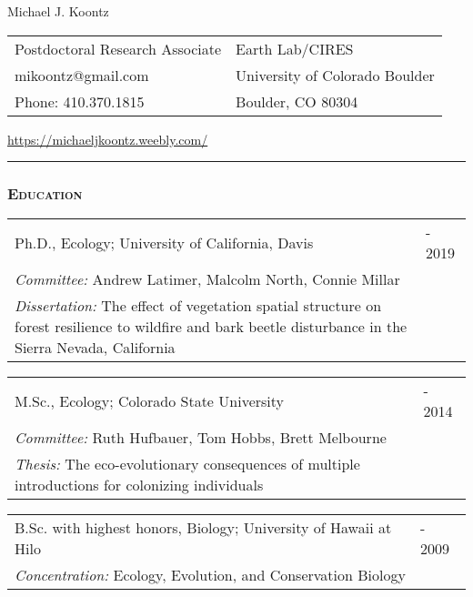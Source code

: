 \documentclass[10pt,english]{article}
\providecommand{\tabularnewline}{\\}
\begin{document}
\begin {center}
{\huge Michael J. Koontz}\tabularnewline
\vspace{1em}

\begin{tabularx}{\textwidth}{@{}>{\raggedright}X >{\raggedleft}X@{}}
Postdoctoral Research Associate & Earth Lab/CIRES \tabularnewline
mikoontz@gmail.com & University of Colorado Boulder \tabularnewline
Phone: 410.370.1815 & Boulder, CO 80304 
\end{tabularx}

\url{https://michaeljkoontz.weebly.com/}
\end{center}
\vspace{-1.5em}

\rule[0.5ex]{1\linewidth}{0.5pt} 


\vspace{0.5ex}
\subsubsection*{\textsc{Education}}
\vspace{-0.5ex}

\renewcommand{\arraystretch}{1.2}
\begin{tabularx}{\textwidth}{@{}>{\raggedright}p{5.25in} >{\raggedleft}X@{}}
Ph.D., Ecology; University of California, Davis & 2014 - 2019 \tabularnewline
\addtolength{\leftskip}{5ex}\emph{Committee:} Andrew Latimer, Malcolm North, Connie Millar &   \tabularnewline
\addtolength{\leftskip}{5ex}\emph{Dissertation:} The effect of vegetation spatial structure on forest resilience to wildfire and bark beetle disturbance in the Sierra Nevada, California & \tabularnewline
\end{tabularx}

\begin{tabularx}{\textwidth}{@{}>{\raggedright}p{5.25in} >{\raggedleft}X@{}}
M.Sc., Ecology; Colorado State University & 2012 - 2014 \tabularnewline
\addtolength{\leftskip}{5ex}\emph{Committee:} Ruth Hufbauer, Tom Hobbs, Brett Melbourne & \tabularnewline
\addtolength{\leftskip}{5ex}\emph{Thesis:} The eco-evolutionary consequences of multiple introductions for colonizing individuals & \tabularnewline
\end{tabularx}

\begin{tabularx}{\textwidth}{@{}>{\raggedright}p{5.25in} >{\raggedleft}X@{}}
B.Sc. with highest honors, Biology; University of Hawaii at Hilo & 2007 - 2009 \tabularnewline
\addtolength{\leftskip}{5ex}\emph{Concentration:} Ecology, Evolution, and Conservation Biology
\end{tabularx}
\end{document}
